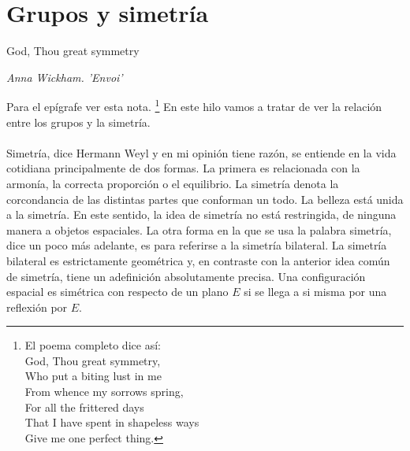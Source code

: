 \documentclass[12pt]{article}
\begin{document}
\section{Grupos y simetría}
\epigraph{God, Thou great symmetry }{\textit{Anna Wickham. 'Envoi'}}  \noindent Para el epígrafe ver esta nota. \footnote{El poema completo dice así: \\ God, Thou great symmetry, \\ Who put a biting lust in me \\
From whence my sorrows spring, \\
For all the frittered days \\
That I have spent in shapeless ways \\
Give me one perfect thing. }
En este hilo vamos a tratar de ver la relación entre los grupos y la simetría. \\\\
Simetría, dice Hermann Weyl y en mi opinión tiene razón, se entiende en la vida cotidiana principalmente de dos formas. La primera es relacionada con la armonía, la correcta proporción o el equilibrio. La simetría denota la corcondancia de las distintas partes que conforman un todo. La belleza está unida a la simetría. En este sentido, la idea de simetría no está restringida, de ninguna manera a objetos espaciales. La otra forma en la que se usa la palabra simetría, dice un poco más adelante, es para referirse a la simetría bilateral. La simetría bilateral es estrictamente geométrica y, en contraste con la anterior idea común de simetría, tiene un adefinición absolutamente precisa. Una configuración espacial es simétrica con respecto de un plano $E$ si  se llega a si misma por una reflexión por $E$. 
\begin{center}
\end{center}
\end{document}
